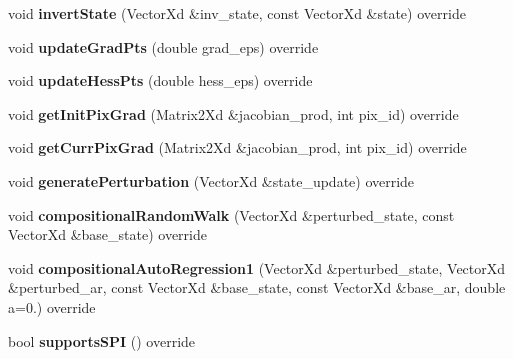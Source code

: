 \begin{DoxyCompactItemize}
\item 
\hypertarget{classHomography_a8276bc865e1657e96904776535d20373}{void {\bfseries invert\-State} (Vector\-Xd \&inv\-\_\-state, const Vector\-Xd \&state) override}\label{classHomography_a8276bc865e1657e96904776535d20373}

\item 
\hypertarget{classHomography_af34ef3821a53ee03a51c58730df89caa}{void {\bfseries update\-Grad\-Pts} (double grad\-\_\-eps) override}\label{classHomography_af34ef3821a53ee03a51c58730df89caa}

\item 
\hypertarget{classHomography_aa643f52dbf4776b938ef6d8275f28868}{void {\bfseries update\-Hess\-Pts} (double hess\-\_\-eps) override}\label{classHomography_aa643f52dbf4776b938ef6d8275f28868}

\item 
\hypertarget{classHomography_a5fb61eb9543babcacf794e401beb3f85}{void {\bfseries get\-Init\-Pix\-Grad} (Matrix2\-Xd \&jacobian\-\_\-prod, int pix\-\_\-id) override}\label{classHomography_a5fb61eb9543babcacf794e401beb3f85}

\item 
\hypertarget{classHomography_afa185b08d4501761b64103e8b43bd89a}{void {\bfseries get\-Curr\-Pix\-Grad} (Matrix2\-Xd \&jacobian\-\_\-prod, int pix\-\_\-id) override}\label{classHomography_afa185b08d4501761b64103e8b43bd89a}

\item 
\hypertarget{classHomography_afd016ecb9b30892708b74ca8dfd58393}{void {\bfseries generate\-Perturbation} (Vector\-Xd \&state\-\_\-update) override}\label{classHomography_afd016ecb9b30892708b74ca8dfd58393}

\item 
\hypertarget{classHomography_ac1b9fd265567ea968aff9c193212ab4a}{void {\bfseries compositional\-Random\-Walk} (Vector\-Xd \&perturbed\-\_\-state, const Vector\-Xd \&base\-\_\-state) override}\label{classHomography_ac1b9fd265567ea968aff9c193212ab4a}

\item 
\hypertarget{classHomography_a5ceed5295f052323c35dc9f279b50305}{void {\bfseries compositional\-Auto\-Regression1} (Vector\-Xd \&perturbed\-\_\-state, Vector\-Xd \&perturbed\-\_\-ar, const Vector\-Xd \&base\-\_\-state, const Vector\-Xd \&base\-\_\-ar, double a=0.) override}\label{classHomography_a5ceed5295f052323c35dc9f279b50305}

\item 
\hypertarget{classHomography_a7786ce0c17abd96ac09538bb56655e83}{bool {\bfseries supports\-S\-P\-I} () override}\label{classHomography_a7786ce0c17abd96ac09538bb56655e83}

\end{DoxyCompactItemize}
